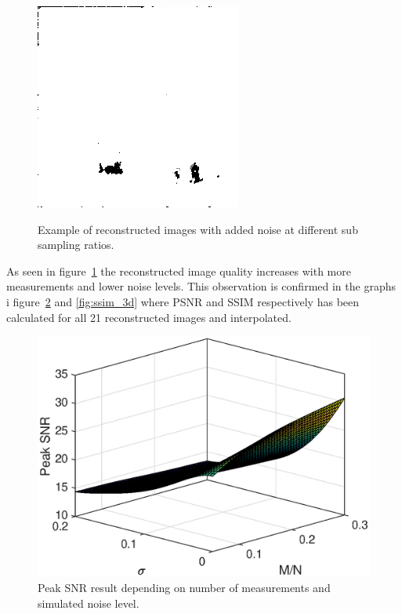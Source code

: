 \begin{figure}[H]
\begin{minipage}[t]{0.245\textwidth}
    \label{fig:noise_30_6}
    \includegraphics[width = \textwidth]{result/noisy/1_30_0.png}
    \label{fig:noise_30_0}
\end{minipage}
	\caption{Example of reconstructed images with added noise at different sub sampling ratios.}
	\label{fig:noisy}
\end{figure}

As seen in figure~\ref{fig:noisy} the reconstructed image quality increases with more measurements and lower noise levels. This observation is confirmed in the graphs i figure~\ref{fig:psnr_3d} and \ref{fig:ssim_3d} where PSNR and SSIM respectively has been calculated for all 21 reconstructed images and interpolated. 

\begin{figure}[H]
    \centering
    \includegraphics[width = 0.7\linewidth]{result/synt_sss/PSNR_fit.eps}
    \caption{Peak SNR result depending on number of measurements and simulated noise level.}
    \label{fig:psnr_3d}
\end{figure}

